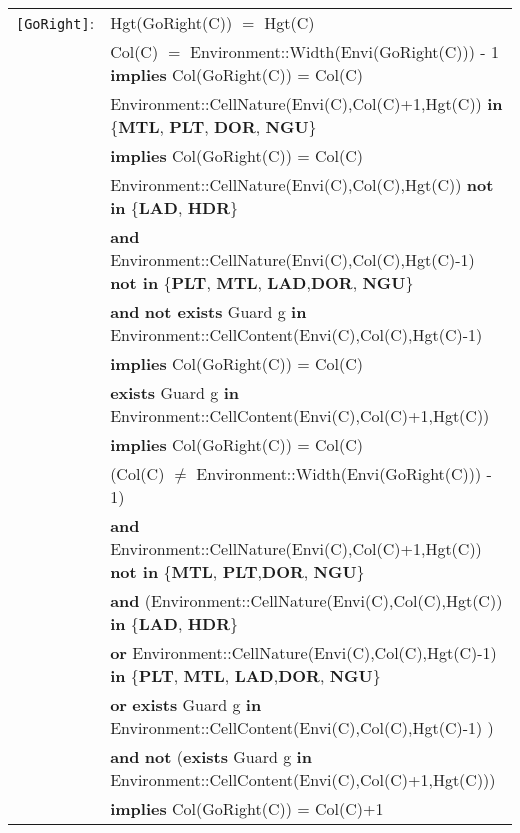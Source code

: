 \documentclass[7pt]{article}
\begin{document}
\begin{tabular}{rl}
\texttt{[GoRight]}: & \textrm{Hgt(GoRight(C))} $=$ \textrm{Hgt(C)} \\
& \textrm{Col(C)} $=$ Environment::Width(Envi(GoRight(C))) - 1 \textbf{implies} \textrm{Col(GoRight(C))} = \textrm{Col(C)} \\
& \textrm{Environment::CellNature(Envi(C),Col(C)+1,Hgt(C))} \textbf{in} \{\textbf{MTL}, \textbf{PLT}, \textbf{DOR}, \textbf{NGU}\} \\
& \quad \textbf{implies} \textrm{Col(GoRight(C))} = \textrm{Col(C)} \\
& \textrm{Environment::CellNature(Envi(C),Col(C),Hgt(C))} \textbf{not in} \{\textbf{LAD}, \textbf{HDR}\}
\\ & \quad\quad \textbf{and} \textrm{Environment::CellNature(Envi(C),Col(C),Hgt(C)-1)} \textbf{not in} \{\textbf{PLT}, \textbf{MTL}, \textbf{LAD},\textbf{DOR}, \textbf{NGU}\} \\
& \quad\quad \textbf{and} \textbf{not exists} \textrm{Guard} g \textbf{in} \textrm{Environment::CellContent(Envi(C),Col(C),Hgt(C)-1)} \\
& \quad\quad \textbf{implies} \textrm{Col(GoRight(C))} = \textrm{Col(C)} \\
& \textbf{exists} \textrm{Guard} g \textbf{in} \textrm{Environment::CellContent(Envi(C),Col(C)+1,Hgt(C))} \\ & \quad\quad \textbf{implies} \textrm{Col(GoRight(C))} = \textrm{Col(C)} \\

& (\textrm{Col(C)} $\neq$  Environment::Width(Envi(GoRight(C))) - 1) \\
& \quad \textbf{and} \textrm{Environment::CellNature(Envi(C),Col(C)+1,Hgt(C))} \textbf{not in} \{\textbf{MTL}, \textbf{PLT},\textbf{DOR}, \textbf{NGU}\} \\
& \quad\quad \textbf{and} (\textrm{Environment::CellNature(Envi(C),Col(C),Hgt(C))} \textbf{in} \{\textbf{LAD}, \textbf{HDR}\} \\
& \quad\quad\quad\quad \textbf{or} \textrm{Environment::CellNature(Envi(C),Col(C),Hgt(C)-1)} \textbf{in} \{\textbf{PLT}, \textbf{MTL}, \textbf{LAD},\textbf{DOR}, \textbf{NGU}\} \\
& \quad\quad\quad\quad \textbf{or} \textbf{exists} \textrm{Guard} g \textbf{in} \textrm{Environment::CellContent(Envi(C),Col(C),Hgt(C)-1)} ) \\
& \quad\quad \textbf{and} \textbf{not} (\textbf{exists} \textrm{Guard} g \textbf{in} \textrm{Environment::CellContent(Envi(C),Col(C)+1,Hgt(C))}) \\
& \quad\quad \textbf{implies} \textrm{Col(GoRight(C))} = \textrm{Col(C)}+1 \\


\end{tabular}
\end{document}
